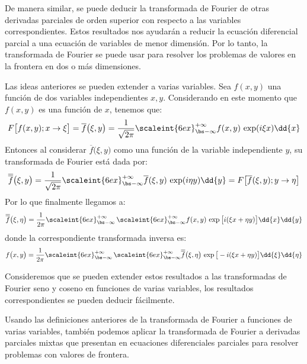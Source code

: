 De manera similar, se puede deducir la transformada de Fourier de otras derivadas parciales de orden superior con respecto a las variables correspondientes. Estos resultados nos ayudarán a reducir la ecuación diferencial parcial a una ecuación de variables de menor dimensión. Por lo tanto, la transformada de Fourier se puede usar para resolver los problemas de valores en la frontera en dos o más dimensiones.
\par
Las ideas anteriores se pueden extender a varias variables. Sea $f (x, y)$ una función de dos variables independientes $x, y$. Considerando en este momento que $f (x, y)$ es una función de $x$, tenemos que:
\begin{align*}
F \big[ f(x, y); x \to \xi \big] = \overline{f} \big( \xi, y \big) = \dfrac{1}{\sqrt{2 \pi}} \scaleint{6ex}_{\bs -\infty}^{+\infty} f(x, y) \, \exp(i \xi x) \dd{x}
\end{align*}
Entonces al considerar $\overline{f} \big( \xi, y \big)$ como una función de la variable independiente $y$, su transformada de Fourier está dada por:
\begin{align*}
\overline{\overline{f}} \big( \xi, y \big) = \dfrac{1}{\sqrt{2 \pi}} \scaleint{6ex}_{\bs -\infty}^{+\infty} \overline{f} (\xi, y) \, \exp(i \eta y) \dd{y} = F \big[ \overline{f} (\xi, y); y \to \eta \big]
\end{align*}
Por lo que finalmente llegamos a:
\begin{align*}
\overline{\overline{f}} \big( \xi, \eta \big) = \dfrac{1}{2 \pi} \scaleint{6ex}_{\bs -\infty}^{+\infty} \, \scaleint{6ex}_{\bs -\infty}^{+\infty} f (x, y) \, \exp\big[ i (\xi x + \eta y) \big] \dd{x} \dd{y}
\end{align*}
donde la correspondiente transformada inversa es:
\begin{align*}
f \big( x, y \big) = \dfrac{1}{2 \pi} \scaleint{6ex}_{\bs -\infty}^{+\infty} \, \scaleint{6ex}_{\bs -\infty}^{+\infty} \overline{\overline{f}} \big( \xi, \eta \big) \, \exp\big[ -i (\xi x + \eta y) \big] \dd{\xi} \dd{\eta}
\end{align*}

Consideremos que se pueden extender estos resultados a las transformadas de Fourier seno y coseno en funciones de varias variables, los resultados correspondientes se pueden deducir fácilmente.
\par
Usando las definiciones anteriores de la transformada de Fourier a funciones de varias variables, también podemos aplicar la transformada de Fourier a derivadas parciales mixtas que presentan en ecuaciones diferenciales parciales para resolver problemas con valores de frontera.

